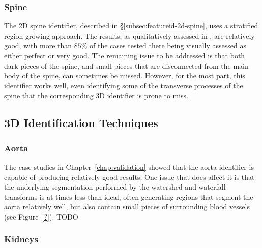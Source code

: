 \subsubsection{Spine}

The 2D spine identifier, described in \S\ref{subsec:featureid-2d-spine}, uses a stratified region growing approach. The results, as qualitatively assessed in \cite{gvcispa09}, are relatively good, with more than $85\%$ of the cases tested there being visually assessed as either perfect or very good. The remaining issue to be addressed is that both dark pieces of the spine, and small pieces that are disconnected from the main body of the spine, can sometimes be missed. However, for the most part, this identifier works well, even identifying some of the transverse processes of the spine that the corresponding 3D identifier is prone to miss.

\subsection{3D Identification Techniques}

\subsubsection{Aorta}

The case studies in Chapter~\ref{chap:validation} showed that the aorta identifier is capable of producing relatively good results. One issue that does affect it is that the underlying segmentation performed by the watershed and waterfall transforms is at times less than ideal, often generating regions that segment the aorta relatively well, but also contain small pieces of surrounding blood vessels (see Figure~\ref{?}). TODO

\subsubsection{Kidneys}

